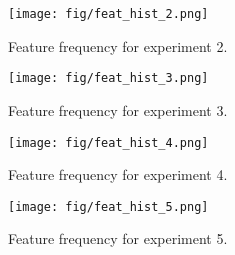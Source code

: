 \begin{figure} [!h]
  \centering
  \texttt{[image: fig/feat\_hist\_2.png]}
  \caption{Feature frequency for experiment 2.}
  \label{fig:feathist.b}
\end{figure}

\begin{figure} [!h]
  \centering
  \texttt{[image: fig/feat\_hist\_3.png]}
  \caption{Feature frequency for experiment 3.}
  \label{fig:feathist.c}
\end{figure}

\begin{figure} [!h]
  \centering
  \texttt{[image: fig/feat\_hist\_4.png]}
  \caption{Feature frequency for experiment 4.}
  \label{fig:feathist.d}
\end{figure}

\begin{figure} [!h]
  \centering
  \texttt{[image: fig/feat\_hist\_5.png]}
  \caption{Feature frequency for experiment 5.}
  \label{fig:feathist.e}
\end{figure}
